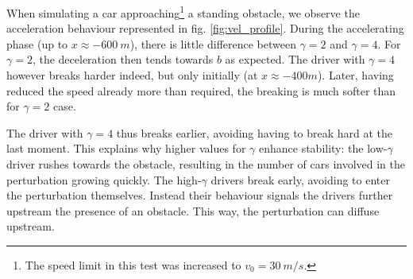 When simulating a car approaching\footnote{The speed limit in this test was increased to $v_0 = \SI{30}{m/s}$.} a standing obstacle, we observe the acceleration behaviour represented in fig. \ref{fig:vel_profile}. During the accelerating phase (up to $x\approx\SI{-600}{m}$), there is little difference between $\gamma=2$ and $\gamma=4$. For $\gamma = 2$, the deceleration then tends towards $b$ as expected. The driver with $\gamma=4$ however breaks harder indeed, but only initially (at $x\approx -{400}{m}$). Later, having reduced the speed already more than required, the breaking is much softer than for $\gamma=2$ case.

The driver with $\gamma=4$ thus breaks earlier, avoiding having to break hard at the last moment. This explains why higher values for $\gamma$ enhance stability: the low-$\gamma$ driver rushes towards the obstacle, resulting in the number of cars involved in the perturbation growing quickly. The high-$\gamma$ drivers break early, avoiding to enter the perturbation themselves. Instead their behaviour signals the drivers further upstream the presence of an obstacle. This way, the perturbation can diffuse upstream.

